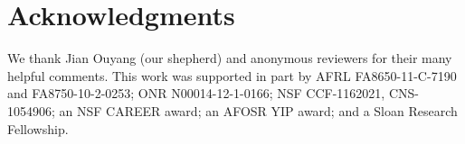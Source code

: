 \section*{Acknowledgments}
We thank Jian Ouyang (our shepherd) and anonymous reviewers for
their many helpful comments.
This work was supported in part by AFRL FA8650-11-C-7190 and FA8750-10-2-0253;
ONR N00014-12-1-0166; NSF CCF-1162021, CNS-1054906;
an NSF CAREER award; an AFOSR YIP award; and a Sloan Research Fellowship.
